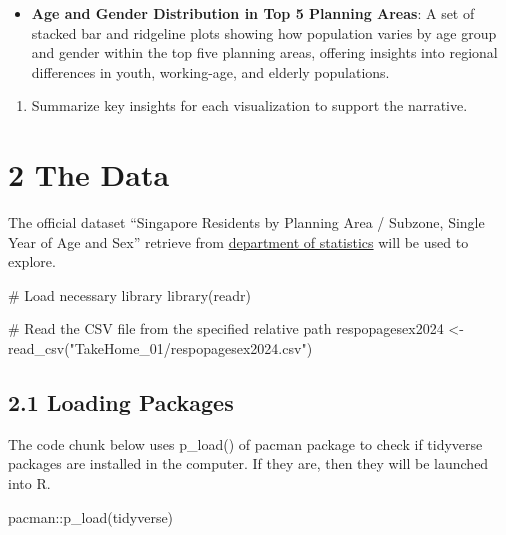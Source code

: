 \documentclass[
  letterpaper,
  DIV=11,
  numbers=noendperiod]{scrartcl}
\newenvironment{Shaded}{\begin{snugshade}}{\end{snugshade}}
\newcommand{\CommentTok}[1]{\textcolor[rgb]{0.37,0.37,0.37}{#1}}
\newcommand{\FunctionTok}[1]{\textcolor[rgb]{0.28,0.35,0.67}{#1}}
\newcommand{\NormalTok}[1]{\textcolor[rgb]{0.00,0.23,0.31}{#1}}
\newcommand{\OtherTok}[1]{\textcolor[rgb]{0.00,0.23,0.31}{#1}}
\newcommand{\SpecialCharTok}[1]{\textcolor[rgb]{0.37,0.37,0.37}{#1}}
\newcommand{\StringTok}[1]{\textcolor[rgb]{0.13,0.47,0.30}{#1}}
\providecommand{\tightlist}{%
  \setlength{\itemsep}{0pt}\setlength{\parskip}{0pt}}\usepackage{longtable,booktabs,array}
\begin{document}
\begin{itemize}
\tightlist
\item
  \textbf{Age and Gender Distribution in Top 5 Planning Areas}: A set of
  stacked bar and ridgeline plots showing how population varies by age
  group and gender within the top five planning areas, offering insights
  into regional differences in youth, working-age, and elderly
  populations.
\end{itemize}

\begin{enumerate}
\def\labelenumi{\arabic{enumi}.}
\setcounter{enumi}{2}
\tightlist
\item
  Summarize key insights for each visualization to support the
  narrative.
\end{enumerate}

\section{2 The Data}\label{the-data}

The official dataset ``Singapore Residents by Planning Area / Subzone,
Single Year of Age and Sex'' retrieve from
\href{https://www.singstat.gov.sg/}{department of statistics} will be
used to explore.

\begin{Shaded}
\begin{Highlighting}[]
\CommentTok{\# Load necessary library}
\FunctionTok{library}\NormalTok{(readr)}

\CommentTok{\# Read the CSV file from the specified relative path}
\NormalTok{respopagesex2024 }\OtherTok{\textless{}{-}} \FunctionTok{read\_csv}\NormalTok{(}\StringTok{"TakeHome\_01/respopagesex2024.csv"}\NormalTok{)}
\end{Highlighting}
\end{Shaded}

\subsection{2.1 Loading Packages}\label{loading-packages}

The code chunk below uses p\_load() of pacman package to check if
tidyverse packages are installed in the computer. If they are, then they
will be launched into R.

\begin{Shaded}
\begin{Highlighting}[]
\NormalTok{pacman}\SpecialCharTok{::}\FunctionTok{p\_load}\NormalTok{(tidyverse)}
\end{Highlighting}
\end{Shaded}
\end{document}
